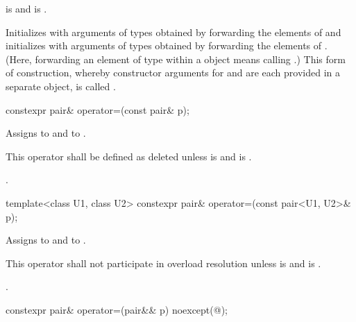 \begin{itemdescr}
\pnum
\requires {} is 
and  is .

\pnum
\effects Initializes  with arguments of types
 obtained by forwarding the elements of 
and initializes  with arguments of types 
obtained by forwarding the elements of . (Here, forwarding
an element  of type  within a  object means calling
.) This form of construction, whereby constructor
arguments for  and  are each provided in a separate
 object, is called .
\end{itemdescr}

%
\begin{itemdecl}
constexpr pair& operator=(const pair& p);
\end{itemdecl}

\begin{itemdescr}
\pnum
\effects Assigns  to  and  to .

\pnum
\remarks This operator shall be defined as deleted unless
 is 
and  is .

\pnum
\returns {}.
\end{itemdescr}

%
\begin{itemdecl}
template<class U1, class U2> constexpr pair& operator=(const pair<U1, U2>& p);
\end{itemdecl}

\begin{itemdescr}
\pnum
\effects Assigns  to  and  to .

\pnum
\remarks This operator shall not participate in overload resolution unless
 is 
and  is .

\pnum
\returns {}.
\end{itemdescr}

%
\begin{itemdecl}
constexpr pair& operator=(pair&& p) noexcept(@\seebelow@);
\end{itemdecl}

